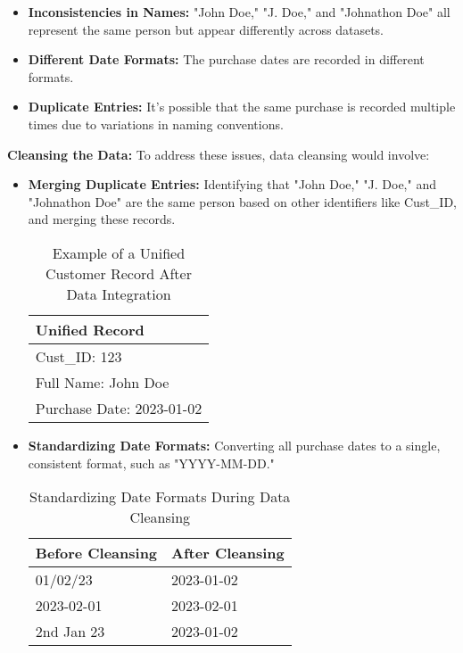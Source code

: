 \documentclass[12pt]{article}
\begin{document}
\begin{itemize}
    \item \textbf{Inconsistencies in Names:} "John Doe," "J. Doe," and "Johnathon Doe" all represent the same person but appear differently across datasets.
    \item \textbf{Different Date Formats:} The purchase dates are recorded in different formats.
    \item \textbf{Duplicate Entries:} It’s possible that the same purchase is recorded multiple times due to variations in naming conventions.
\end{itemize}

\textbf{Cleansing the Data:}
To address these issues, data cleansing would involve:

\begin{itemize}
    \item \textbf{Merging Duplicate Entries:} Identifying that "John Doe," "J. Doe," and "Johnathon Doe" are the same person based on other identifiers like Cust\_ID, and merging these records.

    \begin{table}[h]
        \centering
        \begin{tabular}{|p{12cm}|}
            \hline
            \textbf{Unified Record} \\ \hline
            Cust\_ID: 123 \\ \hline
            Full Name: John Doe \\ \hline
            Purchase Date: 2023-01-02 \\ \hline
        \end{tabular}
        \caption{Example of a Unified Customer Record After Data Integration}
    \end{table}

    \item \textbf{Standardizing Date Formats:} Converting all purchase dates to a single, consistent format, such as "YYYY-MM-DD."
    
    \begin{table}[h]
        \centering
        \begin{tabular}{|p{6cm}|p{6cm}|}
            \hline
            \textbf{Before Cleansing} & \textbf{After Cleansing} \\ \hline
            01/02/23 & 2023-01-02 \\ \hline
            2023-02-01 & 2023-02-01 \\ \hline
            2nd Jan 23 & 2023-01-02 \\ \hline
        \end{tabular}
        \caption{Standardizing Date Formats During Data Cleansing}
    \end{table}
\end{itemize}
\end{document}
